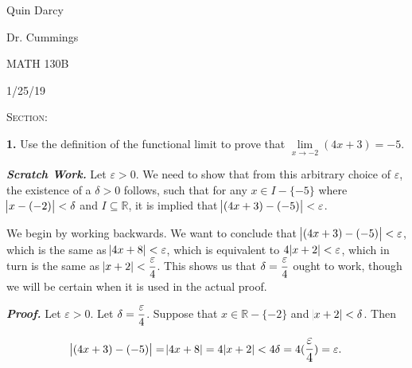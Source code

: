 \documentclass[12pt, a4paper]{article}
\begin{document}
  
\begin{flushleft}
  
    Quin Darcy\par
    Dr. Cummings\par
    MATH 130B\par
    1/25/19
  
\end{flushleft}
  
\centerline{}
 
\vspace{4mm}
 
\noindent\textsc{Section: }\par
 
\justifying
 
\vspace{1mm}
 
\hline
 
\vspace{6mm}

\noindent\textbf{1. } Use the definition of the functional limit to prove that $\lim\limits_{x\rightarrow -2}(4x+3)=-5$.

\begin{description} \justifying

    \item\textit{\textbf{Scratch Work.} } Let $\varepsilon > 0$. We need to show that from this arbitrary choice of $\varepsilon$, the existence of a $\delta>0$ follows, such that for any $x\in I-\{-5\}$ where $\abs{x-(-2)}<\delta$ and $I\subseteq\mathbb{R}$, it is implied that $\abs{(4x+3)-(-5)}<\varepsilon$.\par
    We begin by working backwards. We want to conclude that $\abs{(4x+3)-(-5)}<\varepsilon$, which is the same as $\abs{4x+8}<\varepsilon$, which is equivalent to $4\abs{x+2}<\varepsilon$, which in turn is the same as $\abs{x+2}<\mathlarger{\frac{\varepsilon}{4}}$. This shows us that $\delta = \mathlarger{\frac{\varepsilon}{4}}$ ought to work, though we will be certain when it is used in the actual proof.
    
    \item\textit{\textbf{Proof.} } Let $\varepsilon>0$. Let $\delta=\mathlarger{\frac{\varepsilon}{4}}$. Suppose that $x\in\mathbb{R}-\{-2\}$ and $\abs{x+2}<\delta$. Then
    
    \begin{equation*}
        \abs{(4x+3)-(-5)}=\abs{4x+8}=4\abs{x+2}<4\delta=4(\mathlarger{\frac{\varepsilon}{4}})=\varepsilon.   
    \end{equation*}
    
    \hspace{144mm}\square
    
\end{description}
\end{document}
